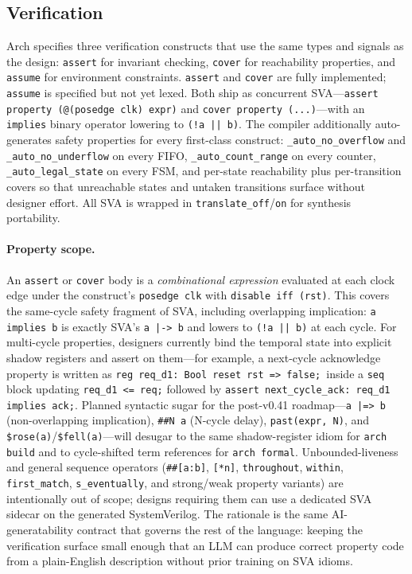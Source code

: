 \documentclass[manuscript]{acmart}
\begin{document}
\subsection{Verification}\label{sec:formal}

Arch specifies three verification constructs that use the same types and signals as the design: \texttt{assert} for invariant checking, \texttt{cover} for reachability properties, and \texttt{assume} for environment constraints. \texttt{assert} and \texttt{cover} are fully implemented; \texttt{assume} is specified but not yet lexed. Both ship as concurrent SVA---\texttt{assert property (@(posedge clk) expr)} and \texttt{cover property (...)}---with an \texttt{implies} binary operator lowering to \texttt{(!a || b)}. The compiler additionally auto-generates safety properties for every first-class construct: \texttt{\_auto\_no\_overflow} and \texttt{\_auto\_no\_underflow} on every FIFO, \texttt{\_auto\_count\_range} on every counter, \texttt{\_auto\_legal\_state} on every FSM, and per-state reachability plus per-transition covers so that unreachable states and untaken transitions surface without designer effort. All SVA is wrapped in \texttt{translate\_off}/\texttt{on} for synthesis portability.

\paragraph{Property scope.} An \texttt{assert} or \texttt{cover} body is a \emph{combinational expression} evaluated at each clock edge under the construct's \texttt{posedge clk} with \texttt{disable iff (rst)}. This covers the same-cycle safety fragment of SVA, including overlapping implication: \texttt{a implies b} is exactly SVA's \texttt{a |-> b} and lowers to \texttt{(!a || b)} at each cycle. For multi-cycle properties, designers currently bind the temporal state into explicit shadow registers and assert on them---for example, a next-cycle acknowledge property is written as \texttt{reg req\_d1: Bool reset rst => false;}\ inside a \texttt{seq} block updating \texttt{req\_d1 <= req;} followed by \texttt{assert next\_cycle\_ack: req\_d1 implies ack;}. Planned syntactic sugar for the post-v0.41 roadmap---\texttt{a |=> b} (non-overlapping implication), \texttt{\#\#N a} (N-cycle delay), \texttt{past(expr, N)}, and \texttt{\$rose(a)}/\texttt{\$fell(a)}---will desugar to the same shadow-register idiom for \texttt{arch build} and to cycle-shifted term references for \texttt{arch formal}. Unbounded-liveness and general sequence operators (\texttt{\#\#[a:b]}, \texttt{[*n]}, \texttt{throughout}, \texttt{within}, \texttt{first\_match}, \texttt{s\_eventually}, and strong/weak property variants) are intentionally out of scope; designs requiring them can use a dedicated SVA sidecar on the generated SystemVerilog. The rationale is the same AI-generatability contract that governs the rest of the language: keeping the verification surface small enough that an LLM can produce correct property code from a plain-English description without prior training on SVA idioms.
\end{document}
